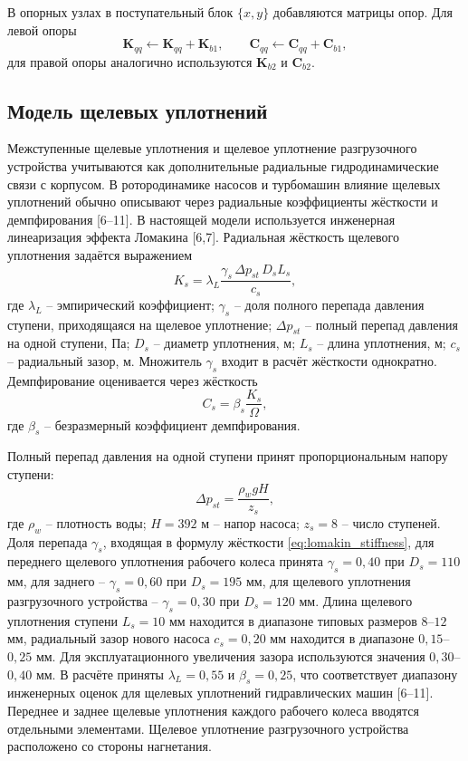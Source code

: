 \documentclass[14pt,a4paper]{extarticle}
\numberwithin{equation}{section}
\numberwithin{figure}{section}
\numberwithin{table}{section}
\begin{document}
В опорных узлах в поступательный блок $\{x,y\}$ добавляются матрицы опор. Для левой опоры
\begin{equation}
    \mathbf{K}_{qq}\leftarrow \mathbf{K}_{qq}+\mathbf{K}_{b1},\qquad
    \mathbf{C}_{qq}\leftarrow \mathbf{C}_{qq}+\mathbf{C}_{b1},
\end{equation}
для правой опоры аналогично используются $\mathbf{K}_{b2}$ и $\mathbf{C}_{b2}$.


\subsection{Модель щелевых уплотнений}

Межступенные щелевые уплотнения и щелевое уплотнение разгрузочного устройства учитываются как дополнительные радиальные гидродинамические связи с корпусом. В ротородинамике насосов и турбомашин влияние щелевых уплотнений обычно описывают через радиальные коэффициенты жёсткости и демпфирования [6--11]. В настоящей модели используется инженерная линеаризация эффекта Ломакина [6,7]. Радиальная жёсткость щелевого уплотнения задаётся выражением
\begin{equation}
    K_s=\lambda_L\frac{\gamma_s\,\Delta p_{st}\,D_s L_s}{c_s},
    \label{eq:lomakin_stiffness}
\end{equation}
где $\lambda_L$ -- эмпирический коэффициент; $\gamma_s$ -- доля полного перепада давления ступени, приходящаяся на щелевое уплотнение; $\Delta p_{st}$ -- полный перепад давления на одной ступени, Па; $D_s$ -- диаметр уплотнения, м; $L_s$ -- длина уплотнения, м; $c_s$ -- радиальный зазор, м. Множитель $\gamma_s$ входит в расчёт жёсткости однократно. Демпфирование оценивается через жёсткость
\begin{equation}
    C_s=\beta_s\frac{K_s}{\Omega},
    \label{eq:seal_damping}
\end{equation}
где $\beta_s$ -- безразмерный коэффициент демпфирования.

Полный перепад давления на одной ступени принят пропорциональным напору ступени:
\begin{equation}
    \Delta p_{st}=\frac{\rho_w gH}{z_s},
    \label{eq:stage_pressure_drop}
\end{equation}
где $\rho_w$ -- плотность воды; $H=392$ м -- напор насоса; $z_s=8$ -- число ступеней. Доля перепада $\gamma_s$, входящая в формулу жёсткости \eqref{eq:lomakin_stiffness}, для переднего щелевого уплотнения рабочего колеса принята $\gamma_s=0{,}40$ при $D_s=110$ мм, для заднего -- $\gamma_s=0{,}60$ при $D_s=195$ мм, для щелевого уплотнения разгрузочного устройства -- $\gamma_s=0{,}30$ при $D_s=120$ мм. Длина щелевого уплотнения ступени $L_s=10$ мм находится в диапазоне типовых размеров $8$--$12$ мм, радиальный зазор нового насоса $c_s=0{,}20$ мм находится в диапазоне $0{,}15$--$0{,}25$ мм. Для эксплуатационного увеличения зазора используются значения $0{,}30$--$0{,}40$ мм. В расчёте приняты $\lambda_L=0{,}55$ и $\beta_s=0{,}25$, что соответствует диапазону инженерных оценок для щелевых уплотнений гидравлических машин [6--11]. Переднее и заднее щелевые уплотнения каждого рабочего колеса вводятся отдельными элементами. Щелевое уплотнение разгрузочного устройства расположено со стороны нагнетания.
\end{document}
